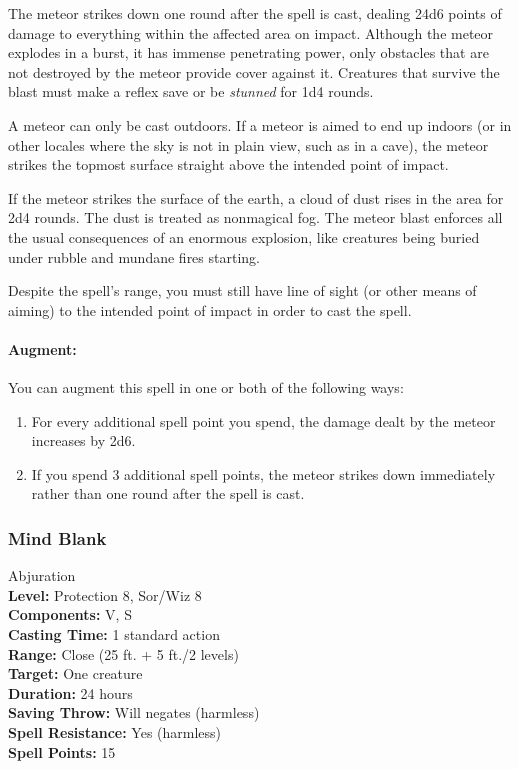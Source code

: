 The meteor strikes down one round after the spell is cast, dealing 24d6 points of damage to everything within the affected area on impact.
Although the meteor explodes in a burst, it has immense penetrating power, only obstacles that are not destroyed by the meteor provide cover against it.
Creatures that survive the blast must make a reflex save or be \emph{stunned} for 1d4 rounds.

A meteor can only be cast outdoors. If a meteor is aimed to end up indoors (or in other locales where the sky is not in plain view, such as in a cave),
the meteor strikes the topmost surface straight above the intended point of impact.

If the meteor strikes the surface of the earth, a cloud of dust rises in the area for 2d4 rounds.
The dust is treated as nonmagical fog.
The meteor blast enforces all the usual consequences of an enormous explosion, like creatures being buried under rubble and mundane fires starting.

Despite the spell's range, you must still have line of sight (or other means of aiming) to the intended point of impact in order to cast the spell.

\paragraph{Augment:} You can augment this spell in one or both of the following ways:
\begin{enumerate}
 \item For every additional spell point you spend, the damage dealt by the meteor increases by 2d6.
 \item If you spend 3 additional spell points, the meteor strikes down immediately rather than one round after the spell is cast.
\end{enumerate}
\subsubsection{Mind Blank}
\label{Spell:MindBlank}
Abjuration
\\ \textbf{Level:} Protection 8, Sor/Wiz 8
\\ \textbf{Components:} V, S
\\ \textbf{Casting Time:} 1 standard action
\\ \textbf{Range:} Close (25 ft. + 5 ft./2 levels)
\\ \textbf{Target:} One creature
\\ \textbf{Duration:} 24 hours
\\ \textbf{Saving Throw:} Will negates (harmless)
\\ \textbf{Spell Resistance:} Yes (harmless)
\\ \textbf{Spell Points:} 15

